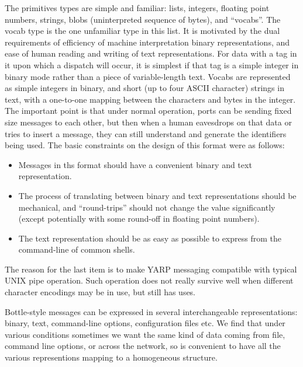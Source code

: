%
The primitives types are simple and familiar:
 lists, integers, floating point
numbers, strings, blobs (uninterpreted sequence of bytes), and
``vocabs''.  The vocab type is the one unfamiliar type in this list.
It is motivated by the dual requirements of efficiency of machine
interpretation binary representations, and ease of human reading and
writing of text representations.  For data with a tag in it upon which
a dispatch will occur, it is simplest if that tag is a simple integer
in binary mode rather than a piece of variable-length text.
Vocabs are represented as simple integers in binary, and short
(up to four ASCII character) strings in text, with a one-to-one
mapping between the characters and bytes in the integer.  
%
%
The important point is that under normal operation, ports can be
sending fixed size messages to each other, but then when a human
eavesdrops on that data or tries to insert a message, they can still
understand and generate the identifiers being used.
%
%
The basic constraints on the design of this format were as follows:

\begin{itemize} \pflist

\item Messages in ths format should have a convenient binary and text
representation.

\item The process of translating between binary and text
representations should be mechanical, and ``round-trips'' should not
change the value significantly (except potentially with some round-off
in floating point numbers).

\item The text representation should be as easy as possible
to express from the command-line of common shells.

\end{itemize}

The reason for the last item is to make YARP messaging compatible
with typical UNIX pipe operation.  Such operation does not 
really survive well when different character encodings may be
in use, but still has uses.


Bottle-style messages
can be expressed in several interchangeable representations:
binary, text, command-line options, configuration
files etc.  
%
We find that under various conditions sometimes we want the same kind
of data coming from file, command line options, or across the network,
so is convenient to have all the various representions mapping to a
homogeneous structure.

